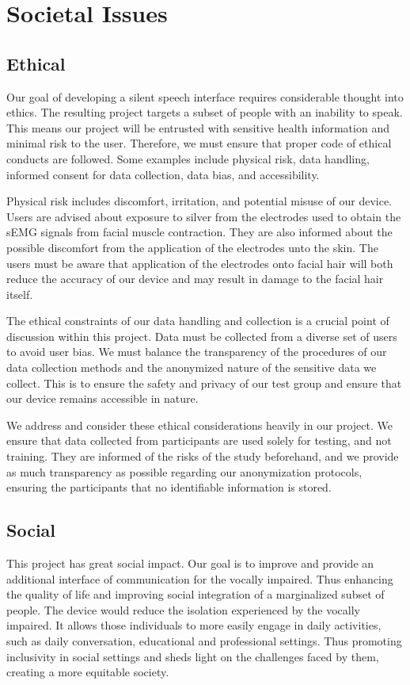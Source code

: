 \chapter{Societal Issues}
\section{Ethical}
Our goal of developing a silent speech interface requires considerable thought into ethics.
The resulting project targets a subset of people with an inability to speak. This means our project
 will be entrusted with sensitive health information and minimal risk to the user. Therefore, we must
ensure that proper code of ethical conducts are followed. Some examples include physical risk, data 
handling, informed consent for data collection, data bias, and accessibility.

Physical risk includes discomfort, irritation, and potential misuse of our device. Users are advised about
 exposure to silver from the electrodes used to obtain the sEMG signals from facial muscle contraction. They are also
 informed about the possible discomfort from the application of the electrodes unto the skin. The users must be aware
 that application of the electrodes onto facial hair will both reduce the accuracy of our device and may result in 
 damage to the facial hair itself.

The ethical constraints of our data handling and collection is a crucial point of discussion within this project.
 Data must be collected from a diverse set of users to avoid user bias. We must balance the transparency of the procedures 
 of our data collection methods and the anonymized nature of the sensitive data we collect. This is to ensure the safety and privacy
 of our test group and ensure that our device remains accessible in nature.

We address and consider these ethical considerations heavily in our project. We ensure that data collected from participants are used
 solely for testing, and not training. They are informed of the risks of the study beforehand, and we provide as much transparency as
 possible regarding our anonymization protocols, ensuring the participants that no identifiable information is stored.

\section{Social}
This project has great social impact. Our goal is to improve and provide an additional interface of communication for the vocally impaired.
 Thus enhancing the quality of life and improving social integration of a marginalized subset of people. The device would reduce the isolation
 experienced by the vocally impaired. It allows those individuals to more easily engage in daily activities, such as daily conversation, educational and professional settings. 
 Thus promoting inclusivity in social settings and sheds light on the challenges faced by them, creating a more equitable society.

